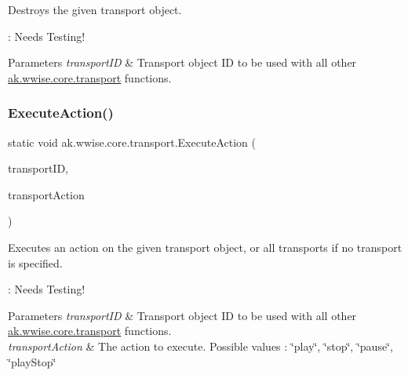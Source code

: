 Destroys the given transport object. 

\+: Needs Testing!


\begin{DoxyParams}{Parameters}
{\em transport\+ID} & Transport object ID to be used with all other \mbox{\hyperlink{classak_1_1wwise_1_1core_1_1transport}{ak.\+wwise.\+core.\+transport}} functions.\\
\hline
\end{DoxyParams}
\mbox{\label{classak_1_1wwise_1_1core_1_1transport_a350a07341027f555a36456b64c5181b7}} 
\subsubsection{\texorpdfstring{Execute\+Action()}{ExecuteAction()}}
{\footnotesize\ttfamily static void ak.\+wwise.\+core.\+transport.\+Execute\+Action (\begin{DoxyParamCaption}\item[{string}]{transport\+ID,  }\item[{\mbox{\hyperlink{class_waapi_c_s_1_1_custom_values_1_1_wwise_values_abe08eb4038ce656dcf1f451b78a35983}{Wwise\+Values.\+transport\+Action}}}]{transport\+Action }\end{DoxyParamCaption})\hspace{0.3cm}{\ttfamily [static]}}



Executes an action on the given transport object, or all transports if no transport is specified. 

\+: Needs Testing!


\begin{DoxyParams}{Parameters}
{\em transport\+ID} & Transport object ID to be used with all other \mbox{\hyperlink{classak_1_1wwise_1_1core_1_1transport}{ak.\+wwise.\+core.\+transport}} functions.\\
\hline
{\em transport\+Action} & The action to execute. Possible values \+: \char`\"{}play\char`\"{}, \char`\"{}stop\char`\"{}, \char`\"{}pause\char`\"{}, \char`\"{}play\+Stop\char`\"{}\\
\hline
\end{DoxyParams}
\mbox{\label{classak_1_1wwise_1_1core_1_1transport_a1fe7ea7c0ee307919f744e6b3a573deb}} 
